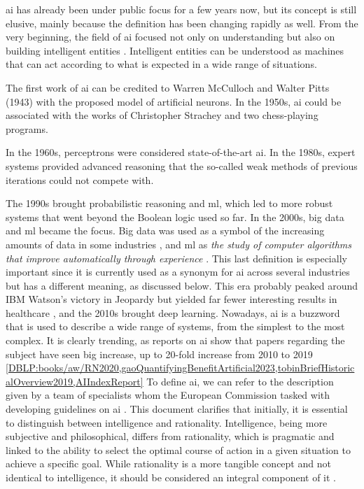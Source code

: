 


\ac{ai} has already been under public focus for a few years now, but its concept is still elusive, mainly because the definition has been changing rapidly as well. From the very beginning, the field of \ac{ai} focused not only on understanding but also on building intelligent entities \cite{DBLP:books/aw/RN2020}. Intelligent entities can be understood as machines that can act according to what is expected in a wide range of situations.

The first work of \ac{ai} can be credited to Warren McCulloch and Walter Pitts (1943) with the proposed model of artificial neurons. In the 1950s, \ac{ai} could be associated with the works of Christopher Strachey and two chess-playing programs.

In the 1960s, perceptrons were considered state-of-the-art \ac{ai}. In the 1980s, expert systems provided advanced reasoning that the so-called weak methods of previous iterations could not compete with.

The 1990s brought probabilistic reasoning and \ac{ml}, which led to more robust systems that went beyond the Boolean logic used so far. In the 2000s, big data and \ac{ml} became the focus. Big data was used as a symbol of the increasing amounts of data in some industries \cite{dashBigDataHealthcare2019}, and \ac{ml} as \textit{the study of computer algorithms that improve automatically through experience} \cite{mitchell1997machine}. This last definition is especially important since it is currently used as a synonym for \ac{ai} across several industries but has a different meaning, as discussed below. This era probably peaked around IBM Watson's victory in Jeopardy but yielded far fewer interesting results in healthcare \cite{swetlitzIBMWatsonSupercomputer2018}, and the 2010s brought deep learning.
Nowadays, \ac{ai} is a buzzword that is used to describe a wide range of systems, from the simplest to the most complex. It is clearly trending, as reports on \ac{ai} show that papers regarding the subject have seen big increase, up to 20-fold increase from 2010 to 2019 \ref{DBLP:books/aw/RN2020,gaoQuantifyingBenefitArtificial2023,tobinBriefHistoricalOverview2019,AIIndexReport}
To define \ac{ai}, we can refer to the description given by a team of specialists whom the European Commission tasked with developing guidelines on \ac{ai} \cite{DefinitionAIMain2019}. This document clarifies that initially, it is essential to distinguish between intelligence and rationality. Intelligence, being more subjective and philosophical, differs from rationality, which is pragmatic and linked to the ability to select the optimal course of action in a given situation to achieve a specific goal. While rationality is a more tangible concept and not identical to intelligence, it should be considered an integral component of it \cite{DefinitionAIMain2019,DBLP:books/aw/RN2020}.

